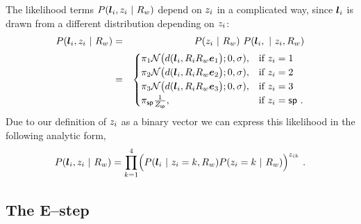The likelihood terms $P(\LineSeg_i,\Indicator_i ~|~ \SceneR)$ depend
on $\Indicator_i$ in a complicated way, since $\LineSeg_i$ is
drawn from a different distribution depending on $\Indicator_i$:
\begin{eqnarray}
  P(\LineSeg_i,\Indicator_i ~|~ \SceneR) &=&
  P(\Indicator_i ~|~ \SceneR)~
  P(\LineSeg_i, ~|~ \Indicator_i, \SceneR)\\
  &=&
  \begin{cases}
    \Mixing_1 
    \NormalDistr\bigr(\dist(\LineSeg_i, \CamR_i\SceneR\ex\bigl); 0,\sigma),
    & \mbox{if } \Indicator_i = 1 \\
    \Mixing_2
    \NormalDistr\bigr(\dist(\LineSeg_i, \CamR_i\SceneR\ey\bigl); 0,\sigma),
    & \mbox{if } \Indicator_i = 2 \\
    \Mixing_3
    \NormalDistr\bigr(\dist(\LineSeg_i, \CamR_i\SceneR\ez\bigl); 0,\sigma),
    & \mbox{if } \Indicator_i = 3 \\
    \Mixing_{\Spurious}
    \frac{1}{Z_\Spurious},
    & \mbox{if } \Indicator_i = \Spurious ~.
  \end{cases}
\end{eqnarray}
Due to our definition of $\Indicator_i$ as a binary vector we can
express this likelihood in the following analytic form,
\begin{equation}
  \label{eq:complete-likelihood}
  P(\LineSeg_i,\Indicator_i ~|~ \SceneR) =
  \prod_{k=1}^4 \Bigl( 
  P(\LineSeg_i ~|~ \Indicator_i=k,\SceneR)
  P(\Indicator_i=k ~|~ \SceneR)
  \Bigr)^{\Indicator_{ik}} ~.
\end{equation}

\subsection{The E--step}


